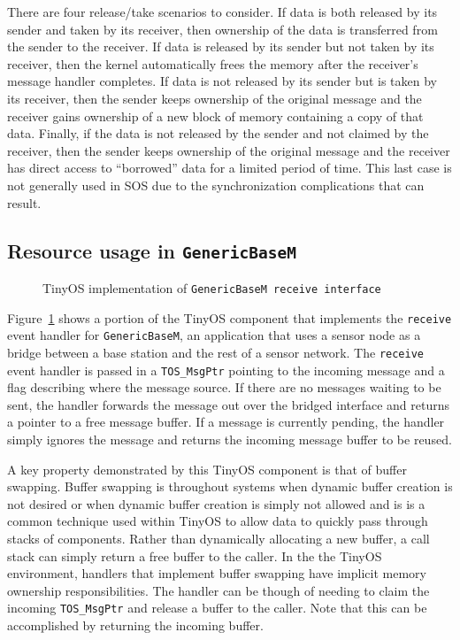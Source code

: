 There are four release/take scenarios to consider.  If data is both
released by its sender and taken by its receiver, then ownership of
the data is transferred from the sender to the receiver.  If data is
released by its sender but not taken by its receiver, then the kernel
automatically frees the memory after the receiver's message handler
completes.  If data is not released by its sender but is taken by its
receiver, then the sender keeps ownership of the original message and
the receiver gains ownership of a new block of memory containing a
copy of that data.  Finally, if the data is not released by the sender
and not claimed by the receiver, then the sender keeps ownership of
the original message and the receiver has direct access to
``borrowed'' data for a limited period of time.  This last case is not
generally used in SOS due to the synchronization complications that
can result.


\subsection{Resource usage in {\tt GenericBaseM}}

\begin{figure}[t]

\caption{TinyOS implementation of {\tt GenericBaseM receive
interface}\label{fig:genericbase}}
\end{figure}


Figure~\ref{fig:genericbase} shows a portion of the TinyOS component
that implements the {\tt receive} event handler for {\tt GenericBaseM},
an application that uses a sensor node as a bridge between a base
station and the rest of a sensor network.  The {\tt receive} event
handler is passed in a {\tt TOS\_MsgPtr} pointing to the incoming
message and a flag describing where the message source.  If there are
no messages waiting to be sent, the handler forwards the message out
over the bridged interface and returns a pointer to a free message
buffer.  If a message is currently pending, the handler simply ignores
the message and returns the incoming message buffer to be reused.

A key property demonstrated by this TinyOS component is that of buffer
swapping.  Buffer swapping is throughout systems when dynamic buffer
creation is not desired or when dynamic buffer creation is simply not
allowed and is is a common technique used within TinyOS to allow data
to quickly pass through stacks of components.  Rather than
dynamically allocating a new buffer, a call stack can simply return a
free buffer to the caller.  In the the TinyOS environment, handlers
that implement buffer swapping have implicit memory ownership
responsibilities.  The handler can be though of needing to claim the
incoming {\tt TOS\_MsgPtr} and release a buffer to the caller.  Note
that this can be accomplished by returning the incoming buffer.


